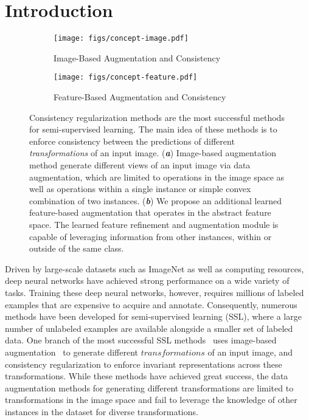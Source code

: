 \documentclass[runningheads]{llncs}
\begin{document}
 \section{Introduction}

\begin{figure}[t]
\begin{subfigure}{\textwidth}
  \centering
  \texttt{[image: figs/concept-image.pdf]}
  \caption{Image-Based Augmentation and Consistency}
  \label{fig:concept-image}
\end{subfigure}

\begin{subfigure}{\textwidth}
  \centering
  \texttt{[image: figs/concept-feature.pdf]}
  \caption{Feature-Based Augmentation and Consistency}
  \label{fig:concept-feature}
\end{subfigure}
\caption{
Consistency regularization methods are the most successful methods for semi-supervised learning.
The main idea of these methods is to enforce consistency between the predictions of different \textit{transformations} of an input image.
(\textit{\textbf{a}}) Image-based augmentation method generate different views of an input image via data augmentation, which are limited to operations in the image space as well as operations within a single instance or simple convex combination of two instances.
(\textit{\textbf{b}})
We propose an additional learned feature-based augmentation that operates in the abstract feature space.
The learned feature refinement and augmentation module is capable of leveraging information from other instances, within or outside of the same class.
}
\label{fig:concept}
\end{figure}


Driven by large-scale datasets such as ImageNet as well as computing resources, deep neural networks have achieved strong performance on a wide variety of tasks.
Training these deep neural networks, however, requires millions of labeled examples that are expensive to acquire and annotate.
Consequently, numerous methods have been developed for semi-supervised learning (SSL), where a large number of unlabeled examples are available alongside a smaller set of labeled data.
One branch of the most successful SSL methods~\cite{Laine2017iclr,miyato2018virtual,qiao2018deep,sajjadi2016regularization,tarvainen2017mean,berthelot2019mixmatch,berthelot2019remixmatch} uses image-based augmentation~\cite{zhang2018mixup,cubuk2019randaugment,hendrycks2020augmix,cubuk2018autoaugment} to generate different $transformations$ of an input image, and consistency regularization to enforce invariant representations across these transformations.
While these methods have achieved great success, the data augmentation methods for generating different transformations are limited to transformations in the image space and fail to leverage the knowledge of other instances in the dataset for diverse transformations.
\end{document}
